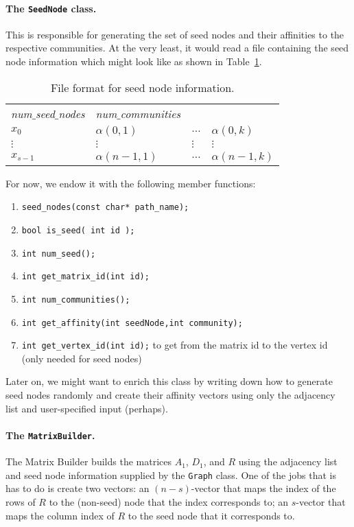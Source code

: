 \documentclass[12pt]{article}
\begin{document}
\paragraph{The \texttt{SeedNode} class.} This is responsible 
for generating the set of seed nodes and their affinities 
to the respective communities. At the very least, it would read 
a file containing the seed node information which might look like 
as shown in Table~\ref{tab:seed_node}. 

\begin{table}[ht]
\centering
\begin{tabular}{llll}
\emph{num$\_$seed$\_$nodes} & \emph{num$\_$communities} &  & \\
$x_0$               & $\alpha(0, 1)$ & $\ldots$ & $\alpha(0, k)$ \\
$\vdots$ & $\vdots$ & $\vdots$ & $\vdots$ \\
$x_{s-1}$  & $\alpha(n-1, 1)$ & $\ldots$ & $\alpha(n-1, k)$ 
\end{tabular}
\caption{File format for seed node information.} \label{tab:seed_node}
\end{table}

For now, we endow it with the following member functions:
\begin{enumerate}
	\item \verb|seed_nodes(const char* path_name);|
	\item \verb|bool is_seed( int id );|
  \item \verb|int num_seed();|
	\item \verb|int get_matrix_id(int id);| 
  \item \verb|int num_communities();| 
  \item \verb|int get_affinity(int seedNode,int community);| 
  \item \verb|int get_vertex_id(int id);| to get from the matrix id to the vertex id (only needed for seed nodes)
\end{enumerate}
Later on, we might want to enrich this class by writing down how 
to generate seed nodes randomly and create their affinity vectors
using only the adjacency list and user-specified input (perhaps). 
	 
\paragraph{The \texttt{MatrixBuilder}.} The Matrix Builder builds the 
matrices $A_1$, $D_1$, and $R$ using the adjacency list and seed node 
information supplied by the \verb|Graph| class. One of the jobs that 
is has to do is create two vectors: an $(n - s)$-vector that maps 
the index of the rows of $R$ to the (non-seed) node that the index 
corresponds to; an $s$-vector that maps the column index of 
$R$ to the seed node that it corresponds to.   
\end{document}
